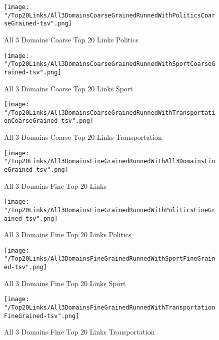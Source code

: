 \documentclass[thesis=M,english]{FITthesis}[2018/05/30]
\begin{document}
	\begin{figure}[H]\centering
		\texttt{[image: "/Top20Links/All3DomainsCoarseGrainedRunnedWithPoliticsCoarseGrained-tsv".png]}
		\caption{All 3 Domains Coarse Top 20 Links Politics}\label{img:All3DomainWithPoliticstCoarseTop20}
	\end{figure}	

	\begin{figure}[H]\centering
		\texttt{[image: "/Top20Links/All3DomainsCoarseGrainedRunnedWithSportCoarseGrained-tsv".png]}
		\caption{All 3 Domains Coarse Top 20 Links Sport}\label{img:All3DomainWithSportCoarseTop20}
	\end{figure}

	\begin{figure}[H]\centering
		\texttt{[image: "/Top20Links/All3DomainsCoarseGrainedRunnedWithTransportationCoarseGrained-tsv".png]}
		\caption{All 3 Domains Coarse Top 20 Links Transportation}\label{All3DomainWithTransportationCoarseTop20}	
	\end{figure}

	\begin{figure}[H]\centering
		\texttt{[image: "/Top20Links/All3DomainsFineGrainedRunnedWithAll3DomainsFineGrained-tsv".png]}
		\caption{All 3 Domains Fine Top 20 Links }\label{img:All3DomainWithAll3DomainFineTop20}	
	\end{figure}

	\begin{figure}[H]\centering
		\texttt{[image: "/Top20Links/All3DomainsFineGrainedRunnedWithPoliticsFineGrained-tsv".png]}
		\caption{All 3 Domains Fine Top 20 Links Politics}\label{All3DomainWithPoliticsFineTop20}
	\end{figure}	

	\begin{figure}[H]\centering
		\texttt{[image: "/Top20Links/All3DomainsFineGrainedRunnedWithSportFineGrained-tsv".png]}
		\caption{All 3 Domains Fine Top 20 Links Sport}\label{img:All3DomainWithSportFineTop20}
	\end{figure}

	\begin{figure}[H]\centering
		\texttt{[image: "/Top20Links/All3DomainsFineGrainedRunnedWithTransportationFineGrained-tsv".png]}
		\caption{All 3 Domains Fine Top 20 Links Transportation}\label{img:All3DomainWithTransportationFineTop20}	
	\end{figure}
\end{document}
